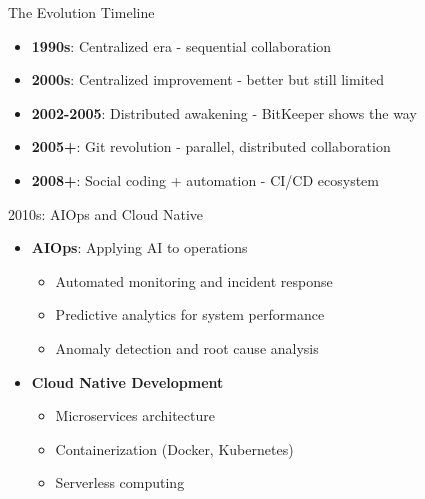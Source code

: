 \documentclass{beamer}
\begin{document}
\begin{frame}[t]{The Evolution Timeline}
\begin{center}
\end{center}

\begin{itemize}
    \item \textbf{1990s}: Centralized era - sequential collaboration
    \item \textbf{2000s}: Centralized improvement - better but still limited
    \item \textbf{2002-2005}: Distributed awakening - BitKeeper shows the way
    \item \textbf{2005+}: Git revolution - parallel, distributed collaboration
    \item \textbf{2008+}: Social coding + automation - CI/CD ecosystem
\end{itemize}
\end{frame}

\begin{frame}[t]{2010s: AIOps and Cloud Native}
\begin{itemize}
    \item \textbf{AIOps}: Applying AI to operations
    \begin{itemize}
        \item Automated monitoring and incident response
        \item Predictive analytics for system performance
        \item Anomaly detection and root cause analysis
    \end{itemize}
    \item \textbf{Cloud Native Development}
    \begin{itemize}
        \item Microservices architecture
        \item Containerization (Docker, Kubernetes)
        \item Serverless computing
    \end{itemize}
\end{itemize}
\begin{center}
\end{center}
\end{frame}
\end{document}
